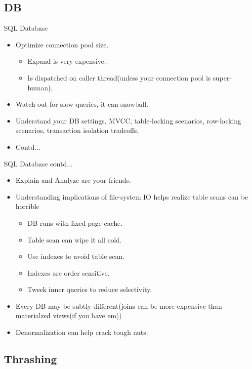 \documentclass{beamer}
\begin{document}
\subsection{DB}

\begin{frame}{SQL Database}
  \begin{itemize}
  \item Optimize connection pool size.
    \begin{itemize}
    \item Expand is very expensive.
    \item Is dispatched on caller thread(unless your connection pool is super-human).
    \end{itemize}
    \pause
  \item Watch out for slow queries, it can snowball. 
    \pause
  \item Understand your DB settings, MVCC, table-locking scenarios, row-locking scenarios, transaction isolation tradeoffs.
    \pause
  \item Contd...
  \end{itemize}
\end{frame}

\begin{frame}{SQL Database contd...}
  \begin{itemize}
  \item Explain and Analyze are your friends.
    \pause
  \item Understanding implications of file-system IO helps realize table scans can be horrible
    \begin{itemize}
    \item DB runs with fixed page cache.
    \item Table scan can wipe it all cold.
    \item Use indexes to avoid table scan.
    \item Indexes are order sensitive.
    \item Tweek inner queries to reduce selectivity.
    \end{itemize}
    \pause
  \item Every DB may be subtly different(joins can be more expensive than materialzed views(if you have em))
    \pause
  \item Denormalization can help crack tough nuts.
  \end{itemize}
\end{frame}

\subsection{Thrashing}
\end{document}
